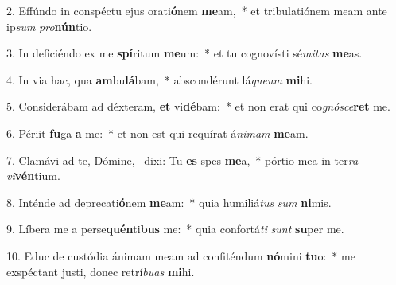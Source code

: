 2. Effúndo in conspéctu ejus orati\textbf{ó}nem \textbf{me}am,~*  et tribulatiónem meam ante ip\textit{sum} \textit{pro}\textbf{nún}tio.\

3. In deficiéndo ex me \textbf{spí}ritum \textbf{me}um:~*  et tu cognovísti sé\textit{mi}\textit{tas} \textbf{me}as.\

4. In via hac, qua \textbf{am}bu\textbf{lá}bam,~*  abscondérunt lá\textit{que}\textit{um} \textbf{mi}hi.\

5. Considerábam ad déxteram, \textbf{et} vi\textbf{dé}bam:~*  et non erat qui co\textit{gnó}\textit{sce}\textbf{ret} me.\

6. Périit \textbf{fu}ga \textbf{a} me:~*  et non est qui requírat á\textit{ni}\textit{mam} \textbf{me}am.\

7. Clamávi ad te, Dómine, \dag\  dixi: Tu \textbf{es} spes \textbf{me}a,~*  pórtio mea in ter\textit{ra} \textit{vi}\textbf{vén}tium.\

8. Inténde ad deprecati\textbf{ó}nem \textbf{me}am:~*  quia humiliá\textit{tus} \textit{sum} \textbf{ni}mis.\

9. Líbera me a perse\textbf{quén}ti\textbf{bus} me:~*  quia confortá\textit{ti} \textit{sunt} \textbf{su}per me.\

10. Educ de custódia ánimam meam ad confiténdum \textbf{nó}mini \textbf{tu}o:~*  me exspéctant justi, donec retrí\textit{bu}\textit{as} \textbf{mi}hi.\

